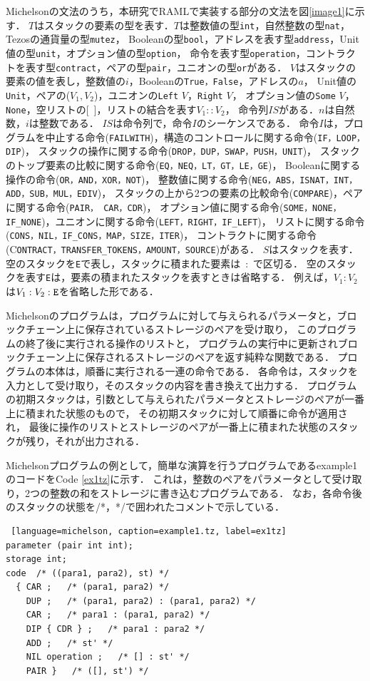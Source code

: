 \documentclass{kuisthesis}
\begin{document}
Michelsonの文法のうち，本研究でRAMLで実装する部分の文法を図\ref{image1}に示す．
$T$はスタックの要素の型を表す．$T$は整数値の型{\tt int}，自然整数の型{\tt nat}，Tezosの通貨量の型{\tt mutez}，
Booleanの型{\tt bool}，アドレスを表す型{\tt address}，Unit値の型{\tt unit}，オプション値の型{\tt option}，
命令を表す型{\tt operation}，コントラクトを表す型{\tt contract}，ペアの型{\tt pair}，ユニオンの型{\tt or}がある．
$V$はスタックの要素の値を表し，整数値の$i$，Booleanの{\tt True，False}，アドレスの$a$，
Unit値の{\tt Unit}，ペアの($V_1,V_2$)，ユニオンの{\tt Left} $V$，{\tt Right} $V$，
オプション値の{\tt Some} $V$，{\tt None}，空リストの[\ ]，リストの結合を表す$V_1 :: V_2$，
命令列$IS$がある．$n$は自然数，$i$は整数である．
$IS$は命令列で，命令$I$のシーケンスである．
命令$I$は，プログラムを中止する命令({\tt FAILWITH})，構造のコントロールに関する命令({\tt IF，LOOP，DIP})，
スタックの操作に関する命令({\tt DROP，DUP，SWAP，PUSH，UNIT})，
スタックのトップ要素の比較に関する命令({\tt EQ，NEQ，LT，GT，LE，GE})，
Booleanに関する操作の命令({\tt OR，AND，XOR，NOT})，
整数値に関する命令({\tt NEG，ABS，ISNAT，INT，ADD，SUB，MUL，EDIV})，
スタックの上から2つの要素の比較命令({\tt COMPARE})，ペアに関する命令({\tt PAIR， CAR，CDR})，
オプション値に関する命令({\tt SOME，NONE，IF\_NONE})，ユニオンに関する命令({\tt LEFT，RIGHT，IF\_LEFT})，
リストに関する命令({\tt CONS，NIL，IF\_CONS，MAP，SIZE，ITER})，
コントラクトに関する命令(C{\tt ONTRACT，TRANSFER\_TOKENS，AMOUNT，SOURCE})がある．
$S$はスタックを表す．空のスタックを{\tt E}で表し，スタックに積まれた要素は\ :\ で区切る．
空のスタックを表す{\tt E}は，要素の積まれたスタックを表すときは省略する．
例えば，$V_1 : V_2$は$V_1 : V_2 : {\tt E}$を省略した形である．




Michelsonのプログラムは，プログラムに対して与えられるパラメータと，ブロックチェーン上に保存されているストレージのペアを受け取り，
このプログラムの終了後に実行される操作のリストと，
プログラムの実行中に更新されブロックチェーン上に保存されるストレージのペアを返す純粋な関数である．
プログラムの本体は，順番に実行される一連の命令である．
各命令は，スタックを入力として受け取り，そのスタックの内容を書き換えて出力する．
プログラムの初期スタックは，引数として与えられたパラメータとストレージのペアが一番上に積まれた状態のもので，
その初期スタックに対して順番に命令が適用され，
最後に操作のリストとストレージのペアが一番上に積まれた状態のスタックが残り，それが出力される．

Michelsonプログラムの例として，簡単な演算を行うプログラムであるexample1のコードをCode \ref{ex1tz}に示す．
これは，整数のペアをパラメータとして受け取り，2つの整数の和をストレージに書き込むプログラムである．
なお，各命令後のスタックの状態を/*，*/で囲われたコメントで示している．
\begin{lstlisting} [language=michelson, caption=example1.tz, label=ex1tz]
parameter (pair int int); 
storage int;
code  /* ((para1, para2), st) */
  { CAR ;   /* (para1, para2) */
    DUP ;   /* (para1, para2) : (para1, para2) */
    CAR ;   /* para1 : (para1, para2) */
    DIP { CDR } ;   /* para1 : para2 */
    ADD ;   /* st' */
    NIL operation ;   /* [] : st' */
    PAIR }   /* ([], st') */
\end{lstlisting}
\end{document}
